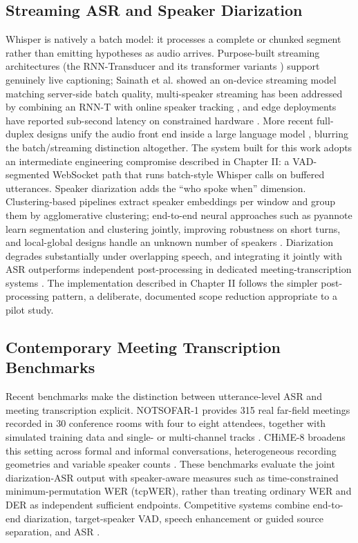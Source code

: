 \documentclass[12pt]{report}
\begin{document}
\subsection{Streaming ASR and Speaker Diarization}
Whisper is natively a batch model: it processes a complete or chunked segment rather than emitting hypotheses as audio arrives. Purpose-built streaming architectures (the RNN-Transducer and its transformer variants \cite{moritz2020streaming,tsunoo2021streaming,chen2021developing}) support genuinely live captioning; Sainath et al. \cite{sainath2020streaming} showed an on-device streaming model matching server-side batch quality, multi-speaker streaming has been addressed by combining an RNN-T with online speaker tracking \cite{sklyar2021streaming}, and edge deployments have reported sub-second latency on constrained hardware \cite{dileo2025realtime}. More recent full-duplex designs unify the audio front end inside a large language model \cite{li2026uaf}, blurring the batch/streaming distinction altogether. The system built for this work adopts an intermediate engineering compromise described in Chapter II: a VAD-segmented WebSocket path that runs batch-style Whisper calls on buffered utterances.
Speaker diarization adds the \enquote{who spoke when} dimension. Clustering-based pipelines extract speaker embeddings per window and group them by agglomerative clustering; end-to-end neural approaches such as pyannote \cite{bredin2020pyannote} learn segmentation and clustering jointly, improving robustness on short turns, and local-global designs handle an unknown number of speakers \cite{maiti2021endtoend}. Diarization degrades substantially under overlapping speech, and integrating it jointly with ASR outperforms independent post-processing in dedicated meeting-transcription systems \cite{raj2021integration,yoshioka2019advances,wang2021exploring}. The implementation described in Chapter II follows the simpler post-processing pattern, a deliberate, documented scope reduction appropriate to a pilot study.
\subsection{Contemporary Meeting Transcription Benchmarks}
Recent benchmarks make the distinction between utterance-level ASR and meeting transcription explicit. NOTSOFAR-1 provides 315 real far-field meetings recorded in 30 conference rooms with four to eight attendees, together with simulated training data and single- or multi-channel tracks \cite{vinnikov2024notsofar}. CHiME-8 broadens this setting across formal and informal conversations, heterogeneous recording geometries and variable speaker counts \cite{cornell2024chime8}. These benchmarks evaluate the joint diarization-ASR output with speaker-aware measures such as time-constrained minimum-permutation WER (tcpWER), rather than treating ordinary WER and DER as independent sufficient endpoints. Competitive systems combine end-to-end diarization, target-speaker VAD, speech enhancement or guided source separation, and ASR \cite{kamo2025chime8}.
\end{document}
